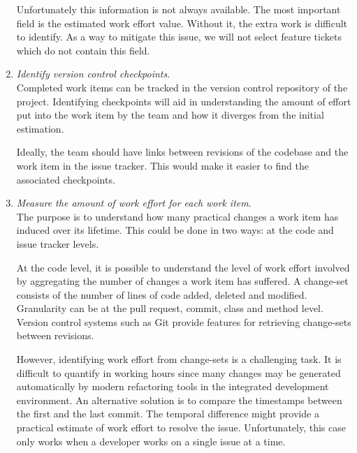\begin{enumerate}
	      Unfortunately this information is not always available. The most
	      important field is the estimated work effort value. Without it, the
	      extra work is difficult to identify. As a way to mitigate this
	      issue, we will not select feature tickets which do not contain this
	      field.

	\item \textit{Identify version control checkpoints}.\\
	      Completed work items can be tracked in the version control repository
	      of the project. Identifying checkpoints will aid in understanding the
	      amount of effort put into the work item by the team and how it
	      diverges from the initial estimation.

	      Ideally, the team should have links between revisions of the codebase and
	      the work item in the issue tracker. This would make it easier to find the
	      associated checkpoints.

	\item \textit{Measure the amount of work effort for each work item}.\\
	      The purpose is to understand how many practical changes a work item
	      has induced over its lifetime. This could be done in two ways: at the
	      code and issue tracker levels.

	      At the code level, it is possible to understand the level of work
	      effort involved by aggregating the number of changes a work item has
	      suffered. A change-set consists of the number of lines of code added,
	      deleted and modified. Granularity can be at the pull request, commit,
	      class and method level. Version control systems such as Git provide
	      features for retrieving change-sets between revisions.

	      However, identifying work effort from change-sets is a challenging
	      task. It is difficult to quantify in working hours since many changes
	      may be generated automatically by modern refactoring tools in the
	      integrated development environment. An alternative solution is to
	      compare the timestamps between the first and the last commit. The
	      temporal difference might provide a practical estimate of work effort
	      to resolve the issue. Unfortunately, this case only works when a
	      developer works on a single issue at a time.


\end{enumerate}

